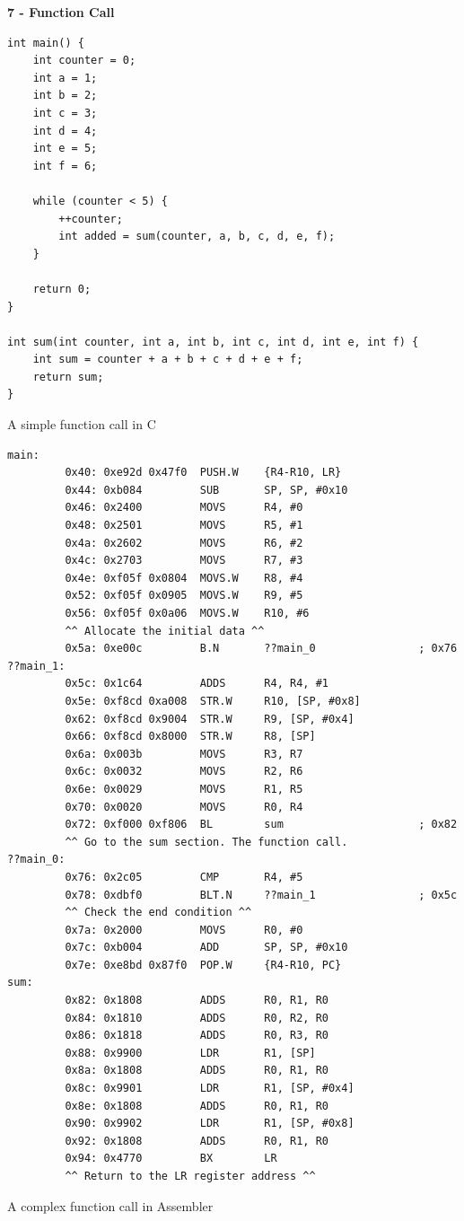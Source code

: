 \documentclass[12pt,a4paper]{report}
\begin{document}
\begin{normalsize}
\textbf{7 - Function Call} \\

\lstset{language=C}
\begin{lstlisting}
int main() {
    int counter = 0;
    int a = 1;
    int b = 2;
    int c = 3;
    int d = 4;
    int e = 5;
    int f = 6;

    while (counter < 5) {
        ++counter;
        int added = sum(counter, a, b, c, d, e, f);
    }

    return 0;
}

int sum(int counter, int a, int b, int c, int d, int e, int f) {
    int sum = counter + a + b + c + d + e + f;
    return sum;
}
\end{lstlisting}	
\begin{center}
\small{A simple function call in C}
\end{center}

\lstset{language=[x86masm]Assembler}
\begin{lstlisting}
main:
         0x40: 0xe92d 0x47f0  PUSH.W    {R4-R10, LR}
         0x44: 0xb084         SUB       SP, SP, #0x10
         0x46: 0x2400         MOVS      R4, #0
         0x48: 0x2501         MOVS      R5, #1
         0x4a: 0x2602         MOVS      R6, #2
         0x4c: 0x2703         MOVS      R7, #3
         0x4e: 0xf05f 0x0804  MOVS.W    R8, #4
         0x52: 0xf05f 0x0905  MOVS.W    R9, #5
         0x56: 0xf05f 0x0a06  MOVS.W    R10, #6
         ^^ Allocate the initial data ^^
         0x5a: 0xe00c         B.N       ??main_0                ; 0x76
??main_1:
         0x5c: 0x1c64         ADDS      R4, R4, #1
         0x5e: 0xf8cd 0xa008  STR.W     R10, [SP, #0x8]
         0x62: 0xf8cd 0x9004  STR.W     R9, [SP, #0x4]
         0x66: 0xf8cd 0x8000  STR.W     R8, [SP]
         0x6a: 0x003b         MOVS      R3, R7
         0x6c: 0x0032         MOVS      R2, R6
         0x6e: 0x0029         MOVS      R1, R5
         0x70: 0x0020         MOVS      R0, R4
         0x72: 0xf000 0xf806  BL        sum                     ; 0x82
         ^^ Go to the sum section. The function call. 
??main_0:
         0x76: 0x2c05         CMP       R4, #5
         0x78: 0xdbf0         BLT.N     ??main_1                ; 0x5c
         ^^ Check the end condition ^^
         0x7a: 0x2000         MOVS      R0, #0
         0x7c: 0xb004         ADD       SP, SP, #0x10
         0x7e: 0xe8bd 0x87f0  POP.W     {R4-R10, PC}
sum:
         0x82: 0x1808         ADDS      R0, R1, R0
         0x84: 0x1810         ADDS      R0, R2, R0
         0x86: 0x1818         ADDS      R0, R3, R0
         0x88: 0x9900         LDR       R1, [SP]
         0x8a: 0x1808         ADDS      R0, R1, R0
         0x8c: 0x9901         LDR       R1, [SP, #0x4]
         0x8e: 0x1808         ADDS      R0, R1, R0
         0x90: 0x9902         LDR       R1, [SP, #0x8]
         0x92: 0x1808         ADDS      R0, R1, R0
         0x94: 0x4770         BX        LR
         ^^ Return to the LR register address ^^
\end{lstlisting}	
\begin{center}
\small{A complex function call in Assembler}
\end{center}



\end{normalsize}
\end{document}
